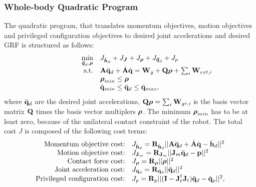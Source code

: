 \subsubsection{Whole-body Quadratic Program}
The quadratic program, that translates momentum objectives, motion objectives and privileged configuration objectives to desired joint accelerations and desired \ac{GRF} is structured as follows:
\begin{equation}
\begin{array}{rlcl}
\displaystyle \min_{\bs{\ddot{q}}_d,\bs{\rho}} & \multicolumn{3}{l}{J_{\bs{\dot{h}}_d} + J_{\bs{J}} + J_{\bs{\rho}} + J_{\bs{\ddot{q}}_d}  + J_p} \\
\textrm{s.t.} & \matr{A}\ddqjntd + \dot{\matr{A}}\dqjnt = \matr{W}_g + \matr{Q}\bs{\rho}+\sum_i\matr{W}_{ext,i}\\
&\displaystyle \bs{\rho}_{min} \leq \bs{\rho}\\
&\ddot{\qjnt}_{min} \leq \ddqjntd \leq \ddot{\qjnt}_{max},
\end{array}
\end{equation}
where $\ddot{\mathbf{q}}_d$ are the desired joint accelerations, $\mathbf{Q}\boldsymbol{\rho} = \sum_i\mathbf{W}_{gr,i}$ is the basis vector matrix $\mathbf{Q}$ times the basis vector multiplers $\boldsymbol{\rho}$. The minimum $\boldsymbol{\rho}_{min}$ has to be at least zero, because of the unilateral contact constraint of the robot. The total cost $J$ is composed of the following cost terms:
\begin{equation*}
\begin{array}{rlcl}
$Momentum objective cost:$ & J_{\dot{\vect{h}}_d}= \wght_{\dot{\vect{h}}_d}||\matr{A}\ddqjntd + \dot{\matr{A}}\dqjnt - \dot{\vect{h}}_d||^2\\
$Motion objective cost:$ & J_{\matr{J}_m} = \wght_{\matr{J}_m}||\matr{J}_m\ddqjntd-\vect{p}||^2\\
$Contact force cost:$ & J_{\bs{\rho}}=\wght_{\bs{\rho}}||\bs{\rho}||^2 \\
$Joint acceleration cost:$ & J_{\ddqjntd} = \wght_{\ddqjntd}||\ddqjntd ||^2 \\
$Privileged configuration cost:$ & J_p = \wght_p||(\matr{I} - \matr{J}_t^{\dagger}\matr{J}_t)\ddqjntd - \ddqjntp||^2,
\end{array}
\end{equation*}
